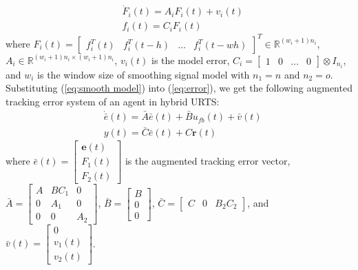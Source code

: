 \documentclass[journal,12pt,onecolumn,draftclsnofoot,]{IEEEtran}
\newtheorem{remark}{Remark}
\begin{document}
\begin{equation} \label{eq:smooth model}
    \begin{split}
        & \dot{F}_i(t)=A_iF_i(t)+v_i(t) \\
        & f_i(t)=C_iF_i(t)        
    \end{split}
\end{equation}
where $F_i(t)=\begin{bmatrix}
    f_i^T(t) & f_i^T(t-h) & \dots & f_i^T(t-wh)
\end{bmatrix}^T\in\mathbb{R}^{(w_i+1)n_i}$, $A_i\in\mathbb{R}^{{(w_i+1)n_i}\times{(w_i+1)n_i}}$, $v_i(t)$ is the model error, $C_i=\begin{bmatrix}
        1 & 0 & \dots & 0
    \end{bmatrix}\otimes I_{n_i}$, and $w_i$ is the window size of smoothing signal model with $n_1=n$ and $n_2 = o$. Substituting (\ref{eq:smooth model}) into (\ref{eq:error}), we get the following augmented tracking error system of an agent in hybrid URTS:
\begin{equation} \label{eq:e_bar}
    \begin{split}
        & \dot{\bar{e}}(t) = \bar{A}\bar{e}(t)+\bar{B}u_{fb}(t)+\bar{v}(t) \\
        & y(t)=\bar{C}\bar{e}(t) + C\pmb{r}(t)
    \end{split}
\end{equation}
where $\bar{e}(t) = \begin{bmatrix}
    \pmb{e}(t) \\ F_1(t) \\ F_2(t)
\end{bmatrix}$ is the augmented tracking error vector, $\bar{A}=\begin{bmatrix}
    A & BC_1 & 0 \\
    0 & A_1 & 0 \\
    0 & 0 & A_2
\end{bmatrix}$, $\bar{B}=\begin{bmatrix}
    B \\ 0 \\ 0
\end{bmatrix}$, $\bar{C}=\begin{bmatrix}
    C & 0 & B_2C_2
\end{bmatrix}$, and $\bar{v}(t)=\begin{bmatrix}
    0 \\ v_1(t) \\ v_2(t)
\end{bmatrix}$.
\end{document}
